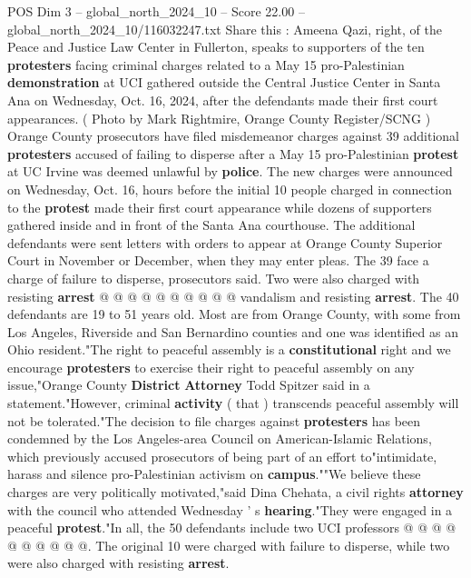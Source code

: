 \begin{textsample}{POS Dim 3 – global\_north\_2024\_10 – Score 22.00 – global\_north\_2024\_10/116032247.txt}  \label{ex:f3_pos_149}
Share this : Ameena Qazi, right, of the Peace and Justice Law Center in Fullerton, speaks to supporters of the ten \textbf{protesters} facing criminal charges related to a May 15 pro-Palestinian \textbf{demonstration} at UCI gathered outside the Central Justice Center in Santa Ana on Wednesday, Oct. 16, 2024, after the defendants made their first court appearances. ( Photo by Mark Rightmire, Orange County Register/SCNG ) Orange County prosecutors have filed misdemeanor charges against 39 additional \textbf{protesters} accused of failing to disperse after a May 15 pro-Palestinian \textbf{protest} at UC Irvine was deemed unlawful by \textbf{police}.
The new charges were announced on Wednesday, Oct. 16, hours before the initial 10 people charged in connection to the \textbf{protest} made their first court appearance while dozens of supporters gathered inside and in front of the Santa Ana courthouse.
The additional defendants were sent letters with orders to appear at Orange County Superior Court in November or December, when they may enter pleas.
The 39 face a charge of failure to disperse, prosecutors said.
Two were also charged with resisting \textbf{arrest} @ @ @ @ @ @ @ @ @ @ vandalism and resisting \textbf{arrest}.
The 40 defendants are 19 to 51 years old.
Most are from Orange County, with some from Los Angeles, Riverside and San Bernardino counties and one was identified as an Ohio resident."The right to peaceful assembly is a \textbf{constitutional} right and we encourage \textbf{protesters} to exercise their right to peaceful assembly on any issue,"Orange County \textbf{District} \textbf{Attorney} Todd Spitzer said in a statement."However, criminal \textbf{activity} ( that ) transcends peaceful assembly will not be tolerated."The decision to file charges against \textbf{protesters} has been condemned by the Los Angeles-area Council on American-Islamic Relations, which previously accused prosecutors of being part of an effort to"intimidate, harass and silence pro-Palestinian activism on \textbf{campus}.""We believe these charges are very politically motivated,"said Dina Chehata, a civil rights \textbf{attorney} with the council who attended Wednesday ' s \textbf{hearing}."They were engaged in a peaceful \textbf{protest}."In all, the 50 defendants include two UCI professors @ @ @ @ @ @ @ @ @ @.
The original 10 were charged with failure to disperse, while two were also charged with resisting \textbf{arrest}.

\end{textsample}
